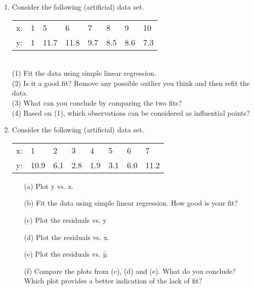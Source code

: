 \documentclass[11pt]{article}
\begin{document}
\begin{enumerate}

\item
Consider the following (artificial) data set.\\
\begin{tabular}{llllllll}
    x: & 1 & 5 & 6 & 7 & 8 & 9 & 10\\
    y: & 1 & 11.7 & 11.8 & 9.7 & 8.5 & 8.6 & 7.3\\
\end{tabular}\\
(1) Fit the data using simple linear regression. \\
(2) Is it a good fit? Remove any possible outlier you think and then refit the data.\\
(3) What can you conclude by comparing the two fits?\\
(4) Based on (1), which observations can be considered as influential points?

\item
Consider the following (artificial) data set.\\
\begin{tabular}{llllllll}
    x: & 1 & 2 & 3 & 4 & 5 & 6 & 7\\
    y: & 10.9 & 6.1 & 2.8 & 1.9 & 3.1 & 6.0 & 11.2\\
\end{tabular}

\begin{enumerate}
\item[(a)] Plot y vs. x.
\item[(b)] Fit the data using simple linear regression. How good
is your fit?
\item[(c)] Plot the residuals vs. y
\item[(d)] Plot the residuals vs. x.
\item[(e)] Plot the residuals vs. $\hat{y}$.
\item[(f)] Compare the plots from (c), (d) and (e). What do you
conclude? Which plot provides a better indication of the lack of
fit?
\end{enumerate}
\end{enumerate}
\end{document}
